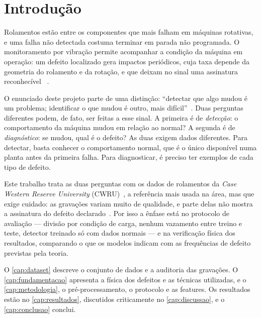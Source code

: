 \chapter{Introdução}
\label{cap:introducao}


Rolamentos estão entre os componentes que mais falham em máquinas rotativas, e
uma falha não detectada costuma terminar em parada não programada. O
monitoramento por vibração permite acompanhar a condição da máquina em operação:
um defeito localizado gera impactos periódicos, cuja taxa depende da geometria do
rolamento e da rotação, e que deixam no sinal uma assinatura reconhecível
~\cite{randall2011livro,randall2011tutorial}.

O enunciado deste projeto parte de uma distinção: \enquote{detectar que algo
mudou é um problema; identificar o que mudou é outro, mais
difícil}~\cite{enunciado2026}. Duas perguntas diferentes podem, de fato, ser
feitas a esse sinal. A primeira é de
\emph{detecção}: o comportamento da máquina mudou em relação ao normal? A
segunda é de \emph{diagnóstico}: se mudou, qual é o defeito? As duas exigem
dados diferentes. Para detectar, basta conhecer o comportamento normal, que é o
único disponível numa planta antes da primeira falha. Para diagnosticar, é
preciso ter exemplos de cada tipo de defeito.

Este trabalho trata as duas perguntas com os dados de rolamentos da
\emph{Case Western Reserve University} (CWRU)~\cite{cwru}, a referência mais usada
na área, mas que exige cuidado: as gravações variam muito de qualidade, e parte
delas não mostra a assinatura do defeito declarado~\cite{smith2015}. Por isso a
ênfase está no protocolo de avaliação --- divisão por condição de carga, nenhum
vazamento entre treino e teste, detector treinado só com dados normais --- e na
verificação física dos resultados, comparando o que os modelos indicam com as
frequências de defeito previstas pela teoria.

O \autoref{cap:dataset} descreve o conjunto de dados e a auditoria das gravações.
O \autoref{cap:fundamentacao} apresenta a física dos defeitos e as técnicas
utilizadas, e o \autoref{cap:metodologia}, o pré-processamento, o protocolo e as
features. Os resultados estão no \autoref{cap:resultados}, discutidos
criticamente no \autoref{cap:discussao}, e o \autoref{cap:conclusao} conclui.

